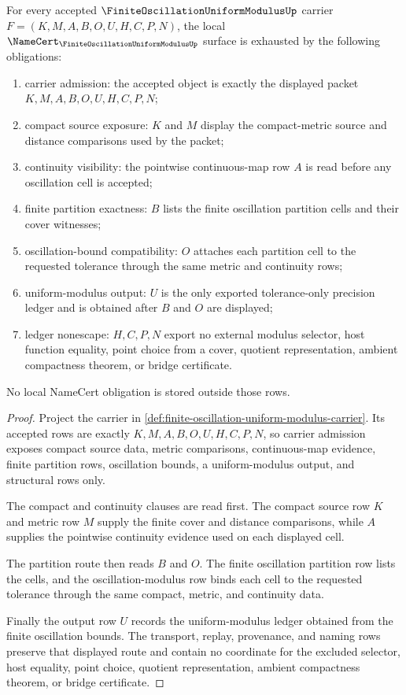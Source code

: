 \begin{theorem}
\label{thm:finite-oscillation-uniform-modulus-namecert-obligations}
For every accepted $\FiniteOscillationUniformModulusUp$ carrier $F=(K,M,A,B,O,U,H,C,P,N)$, the local $\NameCert_{\FiniteOscillationUniformModulusUp}$ surface is exhausted by the following obligations:
\begin{enumerate}
\item carrier admission: the accepted object is exactly the displayed packet $K,M,A,B,O,U,H,C,P,N$;
\item compact source exposure: $K$ and $M$ display the compact-metric source and distance comparisons used by the packet;
\item continuity visibility: the pointwise continuous-map row $A$ is read before any oscillation cell is accepted;
\item finite partition exactness: $B$ lists the finite oscillation partition cells and their cover witnesses;
\item oscillation-bound compatibility: $O$ attaches each partition cell to the requested tolerance through the same metric and continuity rows;
\item uniform-modulus output: $U$ is the only exported tolerance-only precision ledger and is obtained after $B$ and $O$ are displayed;
\item ledger nonescape: $H,C,P,N$ export no external modulus selector, host function equality, point choice from a cover, quotient representation, ambient compactness theorem, or bridge certificate.
\end{enumerate}
No local NameCert obligation is stored outside those rows.
\end{theorem}
\begin{proof}
Project the carrier in \autoref{def:finite-oscillation-uniform-modulus-carrier}. Its accepted rows are exactly $K,M,A,B,O,U,H,C,P,N$, so carrier admission exposes compact source data, metric comparisons, continuous-map evidence, finite partition rows, oscillation bounds, a uniform-modulus output, and structural rows only.

The compact and continuity clauses are read first. The compact source row $K$ and metric row $M$ supply the finite cover and distance comparisons, while $A$ supplies the pointwise continuity evidence used on each displayed cell.

The partition route then reads $B$ and $O$. The finite oscillation partition row lists the cells, and the oscillation-modulus row binds each cell to the requested tolerance through the same compact, metric, and continuity data.

Finally the output row $U$ records the uniform-modulus ledger obtained from the finite oscillation bounds. The transport, replay, provenance, and naming rows preserve that displayed route and contain no coordinate for the excluded selector, host equality, point choice, quotient representation, ambient compactness theorem, or bridge certificate.
\end{proof}


